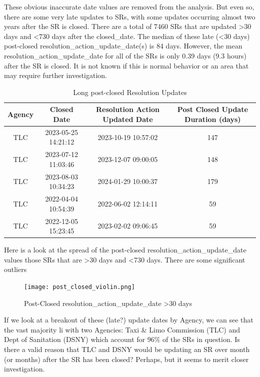 \documentclass[12pt, titlepage]{article}
\begin{document}
{	These obvious inaccurate date values are removed from the analysis. But even so, there are some very late
	updates to SRs, with some updates occurring almost two years after the SR is closed.   There are a total of 7460 SRs that are 
	updated \textgreater{}30 days and \textless{}730 days after the closed\_date. The median of these late (\textless{}30 days)
	post-closed resolution\_action\_update\_date(s) is 84 days. However, the mean resolution\_action\_update\_date 
	for all of the SRs is only 0.39 days (9.3 hours) after the SR is closed. It is not known if this is normal behavior
	or an area that may require further investigation. 
	
	\begin{table}[H]
    \centering
    \footnotesize
	    \begin{tabular}{cccc}
	        \hline
	        Agency & Closed Date & Resolution Action Updated Date & Post Closed Update Duration (days) \\
	        \hline
	        TLC & 2023-05-25 14:21:12 & 2023-10-19 10:57:02 & 147 \\
	        TLC & 2023-07-12 11:03:46 & 2023-12-07 09:00:05 & 148 \\
	        TLC & 2023-08-03 10:34:23 & 2024-01-29 10:00:37 & 179 \\
	        TLC & 2022-04-04 10:54:39 & 2022-06-02 12:14:11 & 59 \\
	        TLC & 2022-12-05 15:23:45 & 2023-02-02 09:06:45 & 59 \\
	        \hline
	    \end{tabular}
    \caption{Long post-closed Resolution Updates}
    \label{tab:resolution}
	\end{table}

	Here is a look at the spread of the post-closed resolution\_action\_update\_date values those SRs 
	that are \textgreater{}30 days and \textless{}730 days. There are some significant outliers 
	
	\begin{figure}[H]
		 \centering
		 \texttt{[image: post\_closed\_violin.png]}
		 \caption{Post-Closed resolution\_action\_update\_date >30 days }
		 \label{fig:resolution-violin}
	\end{figure}		

	If we look at a breakout of these (late?) update dates by Agency, we can see that the vast majority li with two
	Agencies: Taxi \& Limo Commission (TLC) and Dept of Sanitation (DSNY) which account for 96\% of the SRs in
	question.  Is there a valid reason that TLC and DSNY would be updating an SR over month (or months) after
	the SR has been closed? Perhaps, but it seems to merit closer investigation. 

}
\end{document}
